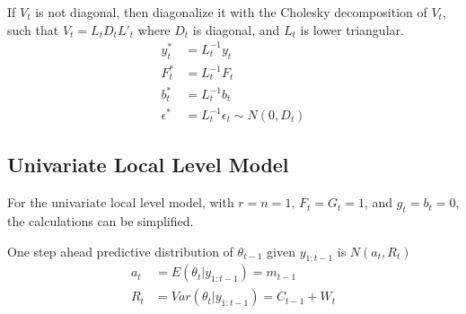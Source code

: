 \documentclass{article}\usepackage[]{graphicx}\usepackage[]{color}
\begin{document}
If $V_{t}$ is not diagonal, then diagonalize it with the Cholesky decomposition of $V_{t}$, such that $V_{t} = L_{t} D_{t} L'_{t}$ where $D_{t}$ is diagonal, and $L_{t}$ is lower triangular.
\begin{align}
  y_{t}^{*} &= L_{t}^{-1} y_{t} \\
  F_{t}^{*} &= L_{t}^{-1} F_{t} \\
  b_{t}^{*} &= L_{t}^{-1} b_{t} \\
  \epsilon^{*} & = L_{t}^{-1} \epsilon_{t}  \sim N(0, D_{t})
\end{align}






\subsection{Univariate Local Level Model}
\label{sec:local-level-model}

For the univariate local level model, with $r = n = 1$, $F_{t} = G_{t} = 1$,
and $g_{t} = b_{t} = 0$, the calculations can be simplified.

One step ahead predictive distribution of $\theta_{t-1}$ given $y_{1:t-1}$ is $N(a_{t}, R_{t})$
\begin{align*}
  a_{t} &= E(\theta_{t} | y_{1:t-1}) = m_{t-1} \\
  R_{t} &= Var(\theta_{t} | y_{1:t-1}) = C_{t-1} + W_{t}
\end{align*}
\end{document}
